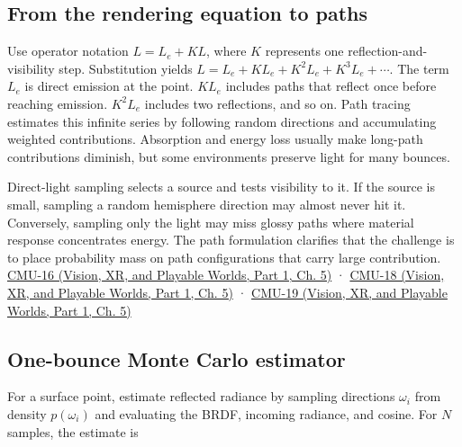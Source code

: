 \subsection{From the rendering equation to paths}\label{03-visual-computing-i-ch011-from-the-rendering-equation-to-paths}

\hypertarget{03-visual-computing-i-ch011-from-the-rendering-equation-to-paths}{}

Use operator notation \(L=L_e+KL\), where \(K\) represents one reflection-and-visibility step. Substitution yields \(L=L_e+KL_e+K^2L_e+K^3L_e+\cdots\). The term \(L_e\) is direct emission at the point. \(KL_e\) includes paths that reflect once before reaching emission. \(K^2L_e\) includes two reflections, and so on. Path tracing estimates this infinite series by following random directions and accumulating weighted contributions. Absorption and energy loss usually make long-path contributions diminish, but some environments preserve light for many bounces.

Direct-light sampling selects a source and tests visibility to it. If the source is small, sampling a random hemisphere direction may almost never hit it. Conversely, sampling only the light may miss glossy paths where material response concentrates energy. The path formulation clarifies that the challenge is to place probability mass on path configurations that carry large contribution. \href{../07-Vision-XR-and-Playable-Worlds-P01/main.pdf\#04-visual-computing-ii-ch036-cmu-16---the-rendering-equation}{CMU-16 (Vision, XR, and Playable Worlds, Part 1, Ch. 5)} · \href{../07-Vision-XR-and-Playable-Worlds-P01/main.pdf\#04-visual-computing-ii-ch036-cmu-18---monte-carlo-rendering}{CMU-18 (Vision, XR, and Playable Worlds, Part 1, Ch. 5)} · \href{../07-Vision-XR-and-Playable-Worlds-P01/main.pdf\#04-visual-computing-ii-ch036-cmu-19---variance-reduction}{CMU-19 (Vision, XR, and Playable Worlds, Part 1, Ch. 5)}

\subsection{One-bounce Monte Carlo estimator}\label{03-visual-computing-i-ch011-one-bounce-monte-carlo-estimator}

\hypertarget{03-visual-computing-i-ch011-one-bounce-monte-carlo-estimator}{}

For a surface point, estimate reflected radiance by sampling directions \(\omega_i\) from density \(p(\omega_i)\) and evaluating the BRDF, incoming radiance, and cosine. For \(N\) samples, the estimate is

